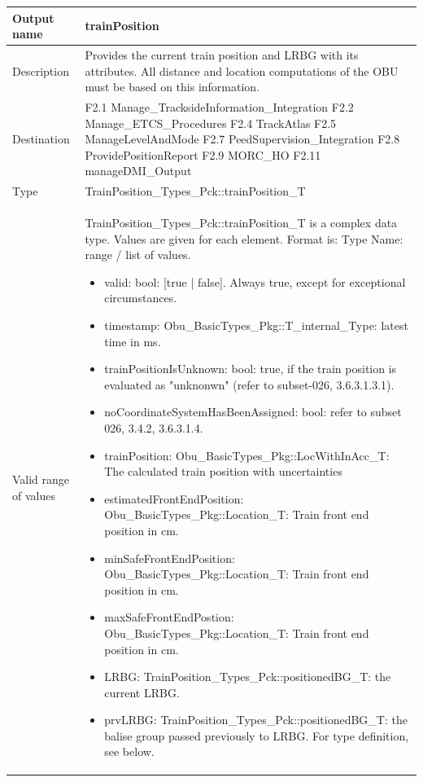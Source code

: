 \begin{longtable}{p{}p{}}
\toprule
Output name				& trainPosition \\
\midrule
Description				& Provides the current train position and LRBG with its attributes. All distance and location computations of the OBU must be based on this information.   \\
\midrule
Destination				& F2.1 Manage\_TracksideInformation\_Integration\newline
F2.2 Manage\_ETCS\_Procedures\newline
F2.4 TrackAtlas\newline
F2.5 ManageLevelAndMode\newline
F2.7 PeedSupervision\_Integration\newline
F2.8 ProvidePositionReport\newline
F2.9 MORC\_HO\newline
F2.11 manageDMI\_Output
\\ 
\midrule
Type					& TrainPosition\_Types\_Pck::trainPosition\_T \\  
\midrule
Valid range of values	& TrainPosition\_Types\_Pck::trainPosition\_T is a complex data type. Values are given for each element. Format is: Type Name: range / list of values.
\begin{itemize}
\item valid: bool: [true | false]. Always true, except for exceptional circumstances.
\item timestamp: Obu\_BasicTypes\_Pkg::T\_internal\_Type: latest time in ms. 
\item trainPositionIsUnknown: bool: true, if the train position is evaluated as "unknonwn" (refer to subset-026, 3.6.3.1.3.1). 
\item noCoordinateSystemHasBeenAssigned: bool: refer to subset 026, 3.4.2, 3.6.3.1.4.
\item trainPosition: Obu\_BasicTypes\_Pkg::LocWithInAcc\_T: The calculated train position with uncertainties
\item estimatedFrontEndPosition: Obu\_BasicTypes\_Pkg::Location\_T: Train front end position in cm.
\item minSafeFrontEndPosition: Obu\_BasicTypes\_Pkg::Location\_T: Train front end position in cm.
\item maxSafeFrontEndPostion: Obu\_BasicTypes\_Pkg::Location\_T: Train front end position in cm.
\item LRBG: TrainPosition\_Types\_Pck::positionedBG\_T: the current LRBG. 
\item prvLRBG: TrainPosition\_Types\_Pck::positionedBG\_T: the balise group passed previously to LRBG. For type definition, see below.

\end{itemize}
\end{longtable}

